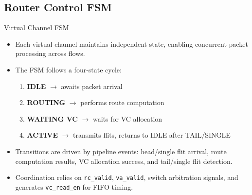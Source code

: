 \documentclass{beamer}
\begin{document}
\subsection{Router Control FSM}
\begin{frame}{Virtual Channel FSM}
	\begin{itemize}
		\item Each virtual channel maintains independent state, enabling concurrent packet processing across flows.
		\item The FSM follows a four-state cycle:
		\begin{enumerate}
			\item \textbf{IDLE} $\rightarrow$ awaits packet arrival
			\item \textbf{ROUTING} $\rightarrow$ performs route computation
			\item \textbf{WAITING VC} $\rightarrow$ waits for VC allocation
			\item \textbf{ACTIVE} $\rightarrow$ transmits flits, returns to IDLE after TAIL/SINGLE
		\end{enumerate}
		\item Transitions are driven by pipeline events: head/single flit arrival, route computation results, VC allocation success, and tail/single flit detection.
		\item Coordination relies on \texttt{rc\_valid}, \texttt{va\_valid}, switch arbitration signals, and generates \texttt{vc\_read\_en} for FIFO timing.
	\end{itemize}
\end{frame}
\end{document}

